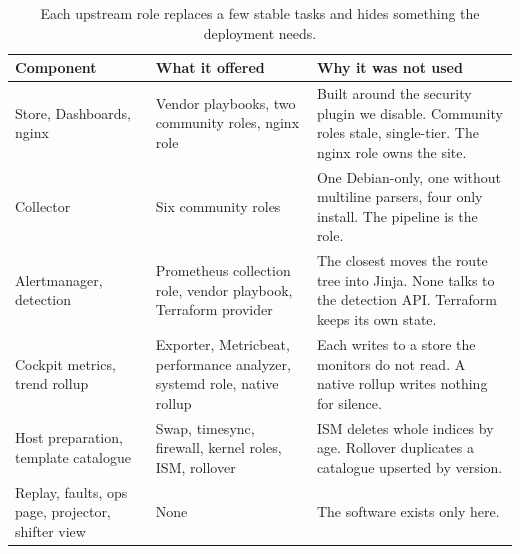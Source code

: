 \begin{table}[htbp]\caption{Each upstream role replaces a few stable tasks and hides something the deployment needs.}\label{tab:upstream}\centering\footnotesize
\begin{tabularx}{\textwidth}{L{0.17\textwidth} L{0.33\textwidth} X}
\toprule
Component & What it offered & Why it was not used \\
\midrule
Store, Dashboards, nginx & Vendor playbooks, two community roles, nginx role & Built around the security plugin we disable. Community roles stale, single-tier. The nginx role owns the site. \\
Collector & Six community roles & One Debian-only, one without multiline parsers, four only install. The pipeline is the role. \\
Alertmanager, detection & Prometheus collection role, vendor playbook, Terraform provider & The closest moves the route tree into Jinja. None talks to the detection API. Terraform keeps its own state. \\
Cockpit metrics, trend rollup & Exporter, Metricbeat, performance analyzer, systemd role, native rollup & Each writes to a store the monitors do not read. A native rollup writes nothing for silence. \\
Host preparation, template catalogue & Swap, timesync, firewall, kernel roles, ISM, rollover & ISM deletes whole indices by age. Rollover duplicates a catalogue upserted by version. \\
Replay, faults, ops page, projector, shifter view & None & The software exists only here. \\
\bottomrule
\end{tabularx}
\end{table}
